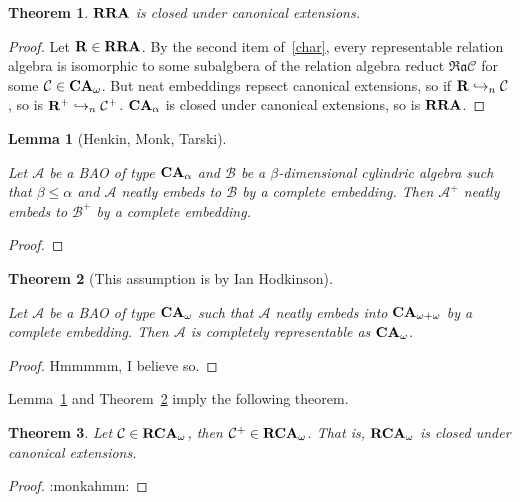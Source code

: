 \documentclass[a4paper]{article}
\theoremstyle{defin}
\theoremstyle{theorem}
\newtheorem{theorem}{Theorem}
\theoremstyle{prop}
\theoremstyle{lemma}
\newtheorem{lemma}{Lemma}
\theoremstyle{fact}
\theoremstyle{ex}
\theoremstyle{col}
\begin{document}
\begin{theorem}
  ${\bf RRA}$ is closed under canonical extensions.
\end{theorem}

\begin{proof} Let ${\bf R} \in {\bf RRA}$.
  By the second item of~\ref{char}, every representable relation algebra is isomorphic to some subalgbera of the relation algebra reduct $\mathfrak{Ra}\mathcal{C}$ for some $\mathcal{C} \in {\bf CA}_{\omega}$. But neat embeddings repsect canonical extensions, so if ${\bf R} \hookrightarrow_{n} \mathcal{C}$, so is ${\bf R}^{+} \hookrightarrow_{n} \mathcal{C}^{+}$.
  ${\bf CA}_{\alpha}$ is closed under canonical extensions, so is ${\bf RRA}$.
\end{proof}

\begin{lemma}[Henkin, Monk, Tarski]\label{Neat}
  $ $

  Let $\mathcal{A}$ be a BAO of type ${\bf CA}_{\alpha}$ and $\mathcal{B}$ be a $\beta$-dimensional cylindric algebra such that $\beta \leq \alpha$ and $\mathcal{A}$ neatly embeds to $\mathcal{B}$ by a complete embedding. Then $\mathcal{A}^{+}$ neatly embeds to $\mathcal{B}^{+}$ by a complete embedding.
\end{lemma}

\begin{proof}
\end{proof}

\begin{theorem}[This assumption is by Ian Hodkinson]\label{Neat2}
  $ $

  Let $\mathcal{A}$ be a BAO of type ${\bf CA}_{\omega}$ such that $\mathcal{A}$ neatly embeds into ${\bf CA}_{\omega + \omega}$ by a complete embedding. Then $\mathcal{A}$ is completely representable as ${\bf CA}_{\omega}$.
\end{theorem}

\begin{proof}
  Hmmmmm, I believe so.
\end{proof}

Lemma~\ref{Neat} and Theorem~\ref{Neat2} imply the following theorem.

\begin{theorem}
  Let $\mathcal{C} \in {\bf RCA}_{\omega}$, then $\mathcal{C}^{+} \in {\bf RCA}_{\omega}$. That is, ${\bf RCA}_{\omega}$ is closed under canonical extensions.
\end{theorem}

\begin{proof}
  :monkahmm:
\end{proof}
\end{document}
